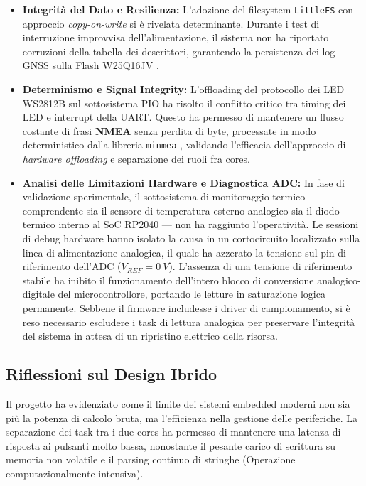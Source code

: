 \begin{itemize}

    \item \textbf{Integrità del Dato e Resilienza:} L'adozione del filesystem \texttt{LittleFS} \cite{littlefs_repo} con approccio \textit{copy-on-write} si è rivelata determinante. Durante i test di interruzione improvvisa dell'alimentazione, il sistema non ha riportato corruzioni della tabella dei descrittori, garantendo la persistenza dei log GNSS sulla Flash W25Q16JV \cite{w25q16_ds}.

    
    \item \textbf{Determinismo e Signal Integrity:} L'offloading del protocollo dei LED WS2812B sul sottosistema PIO ha risolto il conflitto critico tra timing dei LED e interrupt della UART. Questo ha permesso di mantenere un flusso costante di frasi \textbf{NMEA} \cite{nmea_0183} senza perdita di byte, processate in modo deterministico dalla libreria \texttt{minmea} \cite{minmea_lib}, validando l'efficacia dell'approccio di \textit{hardware offloading} e separazione dei ruoli fra cores.
    
    \item \textbf{Analisi delle Limitazioni Hardware e Diagnostica ADC:} In fase di validazione sperimentale, il sottosistema di monitoraggio termico — comprendente sia il sensore di temperatura esterno analogico sia il diodo termico interno al SoC RP2040 — non ha raggiunto l'operatività. Le sessioni di debug hardware hanno isolato la causa in un cortocircuito localizzato sulla linea di alimentazione analogica, il quale ha azzerato la tensione sul pin di riferimento dell'ADC ($V_{REF} = \qty{0}{V}$). L'assenza di una tensione di riferimento stabile ha inibito il funzionamento dell'intero blocco di conversione analogico-digitale del microcontrollore, portando le letture in saturazione logica permanente. Sebbene il firmware includesse i driver di campionamento, si è reso necessario escludere i task di lettura analogica per preservare l'integrità del sistema in attesa di un ripristino elettrico della risorsa.
\end{itemize}

\subsection{Riflessioni sul Design Ibrido}
Il progetto ha evidenziato come il limite dei sistemi embedded moderni non sia più la potenza di calcolo bruta, ma l'efficienza nella gestione delle periferiche. La separazione dei task tra i due cores ha permesso di mantenere una latenza di risposta ai pulsanti molto bassa, nonostante il pesante carico di scrittura su memoria non volatile e il parsing continuo di stringhe (Operazione computazionalmente intensiva).

